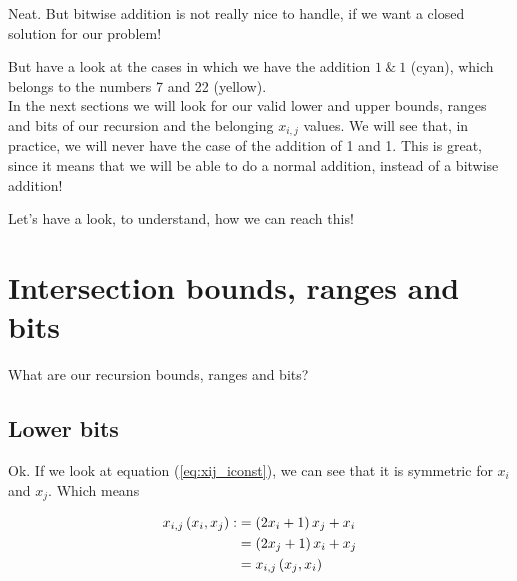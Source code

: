 Neat. But bitwise addition is not really nice to handle, if we want a closed solution for our problem!

\vspace{0.3cm}
But have a look at the cases in which we have the addition $1 \ \& \ 1$ (cyan), which belongs to the numbers 7 and 22 (yellow).\\
In the next sections we will look for our valid lower and upper bounds, ranges and bits of our recursion and the belonging $x_{i,j}$ values. We will see that, in practice, we will never have the case of the addition of 1 and 1. This is great, since it means that we will be able to do a normal addition, instead of a bitwise addition!

\vspace{0.3cm}
Let's have a look, to understand, how we can reach this!
\section{Intersection bounds, ranges and bits}
\label{s:intersectionboundsandranges}
What are our recursion bounds, ranges and bits?
\subsection{Lower bits}
\label{ss:lowerbits}
Ok. If we look at equation (\ref{eq:xij_iconst}), we can see that it is symmetric for $x_{i}$ and $x_{j}$. Which means

\begin{alignat}{3}
	x_{i,j}\left(x_{i},x_{j}\right) :&= \left(2x_{i} + 1\right)x_{j} + x_{i} \notag \\
					& = \left(2x_{j} + 1\right)x_{i} + x_{j} \notag \\
					& = x_{i,j}\left(x_{j},x_{i}\right)
\label{eq:sym}\end{alignat}















